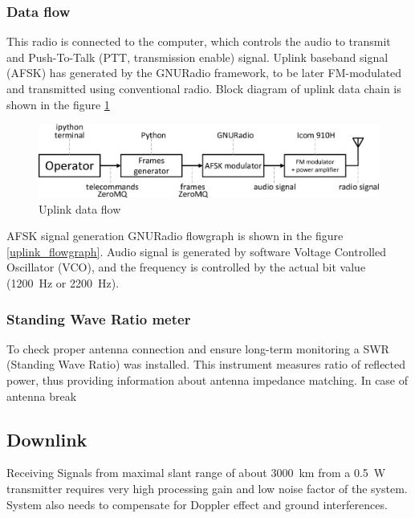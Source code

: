 \subsubsection{Data flow}
This radio is connected to the computer, which controls the audio to transmit and Push-To-Talk (PTT, transmission enable) signal. Uplink baseband signal (AFSK) has generated by the GNURadio framework, to be later FM-modulated and transmitted using conventional radio. Block diagram of uplink data chain is shown in the figure \ref{uplink_data_flow}

\begin{figure}[H]
    \centering
    \includegraphics[width=0.6\paperwidth]{img/3/uplink_data_flow.eps}
    \caption{Uplink data flow}
    \label{uplink_data_flow}
\end{figure}

AFSK signal generation GNURadio flowgraph is shown in the figure \ref{uplink_flowgraph}. Audio signal is generated by software Voltage Controlled Oscillator (VCO), and the frequency is controlled by the actual bit value (\SI{1200}{\hertz} or \SI{2200}{\hertz}).



\subsubsection{Standing Wave Ratio meter}
To check proper antenna connection and ensure long-term monitoring a SWR (Standing Wave Ratio) was installed. This instrument measures ratio of reflected power, thus providing information about antenna impedance matching. In case of antenna break





\subsection{Downlink}
Receiving Signals from maximal slant range of about \SI{3000}{\kilo\meter} from a \SI{0.5}{\watt} transmitter requires very high processing gain and low noise factor of the system. System also needs to compensate for Doppler effect and ground interferences.

